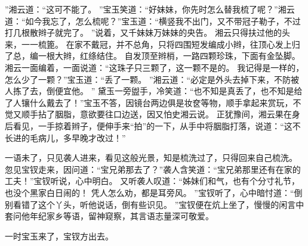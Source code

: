 ”湘云道：“这可不能了。
”宝玉笑道：“好妹妹，你先时怎么替我梳了呢？”湘云道：“如今我忘了，怎么梳呢？”宝玉道：“横竖我不出门，又不带冠子勒子，不过打几根散辫子就完了。
”说着，又千妹妹万妹妹的央告。
湘云只得扶过他的头来，一一梳篦。
在家不戴冠，并不总角，只将四围短发编成小辫，往顶心发上归了总，编一根大辫，红绦结住。
自发顶至辫梢，一路四颗珍珠，下面有金坠脚。
湘云一面编着，一面说道：“这珠子只三颗了，这一颗不是的。
我记得是一样的，怎么少了一颗？”宝玉道：“丢了一颗。
”湘云道：“必定是外头去掉下来，不防被人拣了去，倒便宜他。
”
黛玉一旁盥手，冷笑道：“也不知是真丢了，也不知是给了人镶什么戴去了！”宝玉不答，因镜台两边俱是妆奁等物，顺手拿起来赏玩，不觉又顺手拈了胭脂，意欲要往口边送，因又怕史湘云说。
正犹豫间，湘云果在身后看见，一手掠着辫子，便伸手来“拍”的一下，从手中将胭脂打落，说道：“这不长进的毛病儿，多早晚才改过！”\par
一语未了，只见袭人进来，看见这般光景，知是梳洗过了，只得回来自己梳洗。
忽见宝钗走来，因问道：“宝兄弟那去了？”袭人含笑道：“宝兄弟那里还有在家的工夫！”宝钗听说，心中明白。
又听袭人叹道：“姊妹们和气，也有个分寸礼节，也没个黑家白日闹的！
凭人怎么劝，都是耳旁风。
”宝钗听了，心中暗忖道：“倒别看错了这个丫头，听他说话，倒有些识见。
”宝钗便在炕上坐了，慢慢的闲言中套问他年纪家乡等语，留神窥察，其言语志量深可敬爱。
\par
一时宝玉来了，宝钗方出去。
